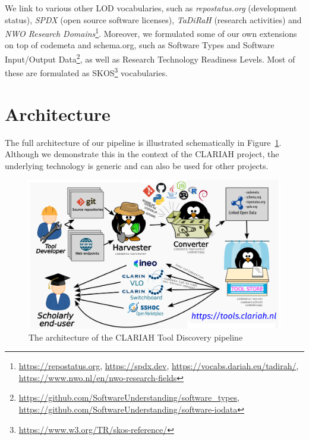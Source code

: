 \documentclass[a4paper,11pt]{article}
\begin{document}
We link to various other LOD vocabularies, such as
\emph{repostatus.org} (development
status), \emph{SPDX} (open source software
licenses), \emph{TaDiRaH} (research activities) \citep{TADIRAH} and \emph{NWO Research Domains}\footnote{\url{https://repostatus.org}, \url{https://spdx.dev}, \url{https://vocabs.dariah.eu/tadirah/}, \url{https://www.nwo.nl/en/nwo-research-fields}}.
Moreover, we formulated some of our own extensions on top of codemeta and
schema.org, such as Software
Types and Software Input/Output
Data\footnote{\url{https://github.com/SoftwareUnderstanding/software_types}, \url{https://github.com/SoftwareUnderstanding/software-iodata}},
as well as Research Technology Readiness Levels. Most of these are formulated as SKOS\footnote{\url{https://www.w3.org/TR/skos-reference/}}
vocabularies.

\section{Architecture}

The full architecture of our pipeline is illustrated schematically in
Figure~\ref{fig:architecture}. Although we demonstrate this in the context of the
CLARIAH project, the underlying technology is generic and can also be used for
other projects.

\begin{figure}[h]
\begin{center}
\includegraphics[width=14.0cm]{architecture.png}
\caption{The architecture of the CLARIAH Tool Discovery pipeline}
\end{center}
\label{fig:architecture}
\end{figure}
\end{document}
